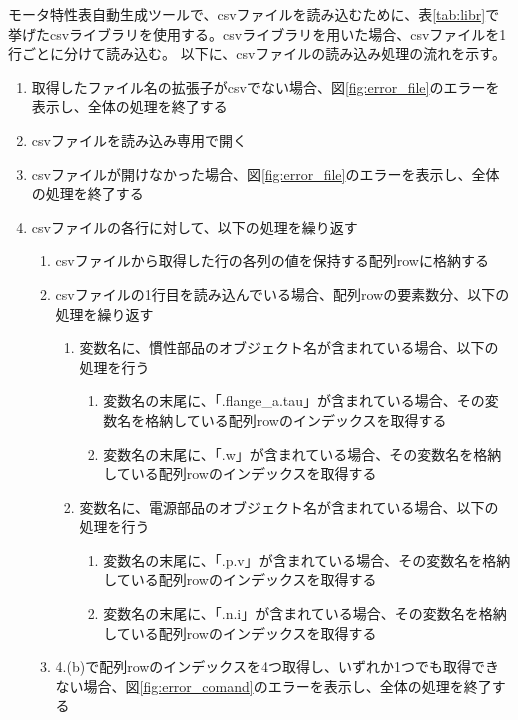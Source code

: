 モータ特性表自動生成ツールで、csvファイルを読み込むために、表\ref{tab:libr}で挙げたcsvライブラリを使用する。csvライブラリを用いた場合、csvファイルを1行ごとに分けて読み込む。
以下に、csvファイルの読み込み処理の流れを示す。
\begin{enumerate}
    \item 取得したファイル名の拡張子がcsvでない場合、図\ref{fig:error_file}のエラーを表示し、全体の処理を終了する
    \item csvファイルを読み込み専用で開く
    \item csvファイルが開けなかった場合、図\ref{fig:error_file}のエラーを表示し、全体の処理を終了する
    \item csvファイルの各行に対して、以下の処理を繰り返す
    \begin{enumerate}
        \item csvファイルから取得した行の各列の値を保持する配列rowに格納する
        \item csvファイルの1行目を読み込んでいる場合、配列rowの要素数分、以下の処理を繰り返す
            \begin{enumerate}
                \item 変数名に、慣性部品のオブジェクト名が含まれている場合、以下の処理を行う
                \begin{enumerate}
                    \item 変数名の末尾に、「.flange\_a.tau」が含まれている場合、その変数名を格納している配列rowのインデックスを取得する
                    \item 変数名の末尾に、「.w」が含まれている場合、その変数名を格納している配列rowのインデックスを取得する
                \end{enumerate}
                \item 変数名に、電源部品のオブジェクト名が含まれている場合、以下の処理を行う
                \begin{enumerate}
                    \item 変数名の末尾に、「.p.v」が含まれている場合、その変数名を格納している配列rowのインデックスを取得する
                    \item 変数名の末尾に、「.n.i」が含まれている場合、その変数名を格納している配列rowのインデックスを取得する
                \end{enumerate}
            \end{enumerate}
            \item 4.(b)で配列rowのインデックスを4つ取得し、いずれか1つでも取得できない場合、図\ref{fig:error_comand}のエラーを表示し、全体の処理を終了する
  

\end{enumerate}
\end{enumerate}
